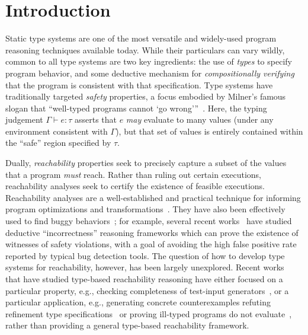 \section{Introduction} %
\label{sec:intro}


Static type systems are one of the most versatile and widely-used
program reasoning techniques available today. While their particulars
can vary wildly, common to all type systems are two key ingredients:
the use of \emph{types} to specify program behavior, and some
deductive mechanism for \emph{compositionally verifying} that the
program is consistent with that specification.  Type systems have
traditionally targeted \emph{safety} properties, a focus embodied by
Milner's famous slogan that ``well-typed programs cannot {`go
wrong'}''~\cite{Milner+78}. Here, the typing judgement $\Gamma \vdash e
: \tau$ asserts that $e$ \emph{may} evaluate to many values (under any
environment consistent with $\Gamma$), but that set of values is
entirely contained within the ``safe'' region specified by $\tau$.

Dually, \emph{reachability} properties seek to precisely capture a
subset of the values that a program \emph{must} reach. Rather than
ruling out certain executions, reachability analyses seek to certify
the existence of feasible executions.  Reachability analyses are a
well-established and practical technique for informing program
optimizations and transformations~\cite{WS94,GM21,JTW+98}.  They have
also been effectively used to find buggy behaviors~\cite{BMC+03}; for
example, several recent works~\cite{GOS19,ReverseHoareLogic, OHP19,
  ZDS23} have studied deductive ``incorrectness'' reasoning frameworks
which can prove the existence of witnesses of safety violations, with
a goal of avoiding the high false positive rate reported by typical
bug detection tools.  The question of how to develop type systems for
reachability, however, has been largely unexplored.  Recent
works~\cite{RefinementTypeRefutations, CoverageType, Ill-types} that
have studied type-based reachability reasoning have either focused on
a particular property, e.g., checking completeness of test-input
generators~\cite{CoverageType}, or a particular application, e.g.,
generating concrete counterexamples refuting refinement type
specifications~\cite{RefinementTypeRefutations} or proving ill-typed
programs do not evaluate~\cite{Ill-types}, rather than providing a
general type-based reachability framework.


